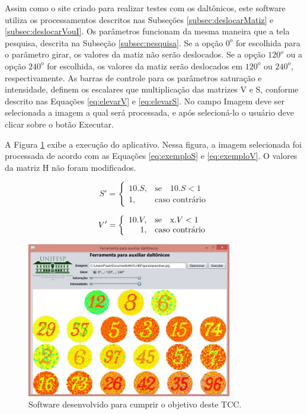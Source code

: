 \documentclass[	12pt, Times, openright, twoside, a4paper, english, brazil]{abntex2}
\begin{document}
Assim como o site criado para realizar testes com os daltônicos, este software utiliza os processamentos descritos nas Subseções \ref{subsec:deslocarMatiz} e \ref{subsec:deslocarVouI}. Os parâmetros funcionam da mesma maneira que a tela pesquisa, descrita na Subseção \ref{subsec:pesquisa}. Se a opção $0^o$ for escolhida para o parâmetro girar, os valores da matiz não serão deslocados. Se a opção $120^o$ ou a opção $240^o$ for escolhida, os valores da matiz serão deslocados em $120^o$ ou $240^o$, respectivamente. As barras de controle para os parâmetros saturação e intensidade, definem os escalares que multiplicação das matrizes V e S, conforme descrito nas Equações \ref{eq:elevarV} e \ref{eq:elevarS}. No campo Imagem deve ser selecionada a imagem a qual será processada, e após selecioná-lo o usuário deve clicar sobre o botão Executar.

A Figura \ref{fig:telaFerramenta} exibe a execução do aplicativo. Nessa figura, a imagem selecionada foi processada de acordo com as Equações \ref{eq:exemploS} e \ref{eq:exemploV}. O valores da matriz H não foram modificados.

\begin{equation}
\label{eq:exemploS}
S'=\left\{
\begin{array}{rl}
       10 . S,&\mbox{se}\quad 10 . S < 1 \\
       1,&\mbox{caso contrário}
\end{array}\right.
\end{equation}

\begin{equation}
\label{eq:exemploV}
V'=\left\{
\begin{array}{rl}
       10 . V,&\mbox{se}\quad $x$ . V < 1 \\
       1,&\mbox{caso contrário}
\end{array}\right.
\end{equation}


\begin{figure}[!htb]
\centering \includegraphics[width=0.8\textwidth]{telaFerramenta.jpg}
\caption{Software desenvolvido para cumprir o objetivo deste TCC.} \label{fig:telaFerramenta}
\end{figure}
\end{document}
